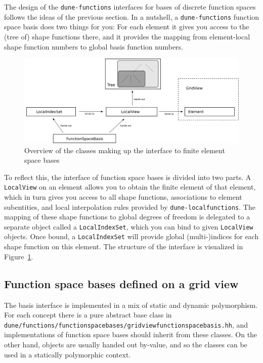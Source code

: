 \documentclass[a4paper,10pt,headings=normal,bibliography=totoc]{scrartcl}
\newcommand{\cpp}[1]{\lstinline[basicstyle=\ttfamily]!#1!}
\newcommand{\dunemodule}[1]{\texttt{#1}}
\newcommand{\file}[1]{\texttt{#1}}
\begin{document}
The design of the \dunemodule{dune-functions} interfaces for bases of discrete function spaces
follows the ideas of the previous section.  In a nutshell, a \dunemodule{dune-functions} function space basis
does two things for you: For each element it gives you access to the (tree of) shape functions there,
and it provides the mapping from element-local shape function numbers to global basis function numbers.

\begin{figure}
 \begin{center}
  \includegraphics[width=\textwidth]{febasis_interface_schematic}
 \end{center}
 \caption{Overview of the classes making up the interface to finite element space bases}
 \label{fig:dune_functions:febasis_interface_schematic}
\end{figure}


To reflect this, the interface of function space bases is divided into two parts.  A \cpp{LocalView} on an
element allows you to obtain the finite element of that element, which in turn gives you access to all
shape functions, associations to element subentities, and local interpolation rules provided by
\dunemodule{dune-localfunctions}.  The mapping of these shape functions to global degrees of freedom is
delegated to a separate object called a \cpp{LocalIndexSet}, which you can bind to given
\cpp{LocalView} objects.  Once bound, a \cpp{LocalIndexSet} will provide global (multi-)indices
for each shape function on this element.  The structure of the interface is visualized in
Figure~\ref{fig:dune_functions:febasis_interface_schematic}.

\subsection{Function space bases defined on a grid view}

The basis interface is implemented in a mix of static and dynamic polymorphism.  For each concept
there is a pure abstract base class in \file{dune/functions/functionspacebases/gridviewfunctionspacebasis.hh},
and implementations of function space bases should inherit from these classes.  On the other hand,
objects are usually handed out by-value, and so the classes can be used in a statically polymorphic
context.
\end{document}
